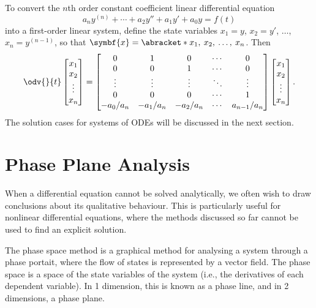 \documentclass{article}
\begin{document}
To convert the \(n\)th order constant coefficient linear differential equation
\begin{equation*}
    a_n y^{\left( n \right)} + \cdots + a_2 y'' + a_1 y' + a_0 y = f\left( t \right)
\end{equation*}
into a first-order linear system, define the state variables \(x_1 = y\), \(x_2 = y'\), \(\ldots\), \(x_n = y^{\left( n - 1 \right)}\), so that
\(\symbf{x} = \abracket*{x_1,\: x_2,\: \ldots,\: x_n}\). Then
\begin{equation*}
    \odv{}{t} \begin{bmatrix}
        x_1    \\
        x_2    \\
        \vdots \\
        x_n
    \end{bmatrix} =
    \begin{bmatrix}
        0        & 1        & 0        & \cdots & 0           \\
        0        & 0        & 1        & \cdots & 0           \\
        \vdots   & \vdots   & \vdots   & \ddots & \vdots      \\
        0        & 0        & 0        & \cdots & 1           \\
        -a_0/a_n & -a_1/a_n & -a_2/a_n & \cdots & a_{n-1}/a_n
    \end{bmatrix}
    \begin{bmatrix}
        x_1    \\
        x_2    \\
        \vdots \\
        x_n
    \end{bmatrix}.
\end{equation*}
The solution cases for systems of ODEs will be discussed in the next section.
\newpage
\section{Phase Plane Analysis}
When a differential equation cannot be solved analytically, we often wish to draw
conclusions about its qualitative behaviour.
This is particularly useful for nonlinear differential equations, where the methods discussed so far
cannot be used to find an explicit solution.

The phase space method is a graphical method for analysing a system through a phase portait,
where the flow of states is represented by a vector field.
The phase space is a space of the state variables of the system (i.e., the derivatives of each dependent variable).
In 1 dimension, this is known as a phase line, and in 2 dimensions, a phase plane.
\end{document}
